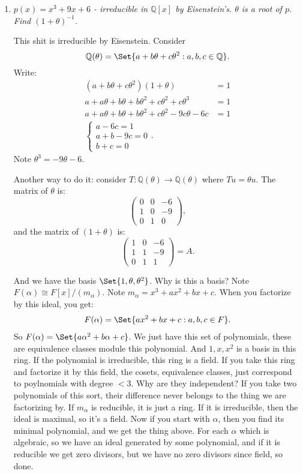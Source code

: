\documentclass[9pt,reqno,twoside]{amsbook}
\theoremstyle{plain}
\numberwithin{section}{chapter}
\numberwithin{equation}{chapter}
\theoremstyle{definition}
\theoremstyle{remark}
\theoremstyle{plain}
\newcommand{\Q}{\mathbb{Q}}
\newcommand{\bee}{\begin{equation}\begin{aligned}}
\newcommand{\eee}{\end{aligned}\end{equation}}
\newcommand{\lpar}{\left(}
\newcommand{\rpar}{\right)}
\begin{document}
\begin{enumerate}[label=\arabic*.]

\item \textit{$p(x) = x^3 + 9x + 6$ - irreducible in $\Q[x]$ by Eisenstein's. $\theta$ is a root of $p$. Find $(1 + \theta)^{-1}$. }

This shit is irreducible by Eisenstein. Consider 
$$
\Q(\theta) = \Set{a + b\theta + c\theta^2: a,b,c \in \Q}.
$$ 
Write:
\bee
(a + b\theta + c\theta^2)(1 + \theta) &= 1\\
a + a\theta + b\theta + b\theta^2 + c\theta^2 + c\theta^3 &= 1\\
a + a\theta + b\theta + b\theta^2 + c\theta^2 - 9c\theta -6c &= 1\\
\begin{cases}
a - 6c = 1\\
a + b - 9c = 0\\
b + c = 0
\end{cases}.
\eee
Note $\theta^3 = -9\theta - 6$. 

Another way to do it: consider $T: \Q(\theta) \to \Q(\theta)$ where $Tu = \theta u$. The matrix of $\theta$ is:
$$
\lpar 
\begin{matrix}
0 & 0 & -6\\
1 & 0 & -9\\
0 & 1 & 0
\end{matrix} \rpar,
$$
and the matrix of $(1 + \theta)$ is:
$$
\lpar 
\begin{matrix}
1 & 0 & -6\\
1 & 1 & -9\\
0 & 1 & 1
\end{matrix} \rpar = A.
$$

And we have the basis $\Set{1,\theta, \theta^2}$. Why is this a basis? Note $F(\alpha) \cong F[x]/(m_{\alpha})$. Note $m_{\alpha} = x^3 + ax^2 + bx + c$. When you factorize by this ideal, you get:
\bee
F(\alpha) = \Set{ax^2 + bx + c: a,b,c \in F}.
\eee
So $F(\alpha) = \Set{a\alpha^2 + b\alpha + c}$. We just have this set of polynomials, these are equivalence classes module this polynomial. And $1,x,x^2$ is a basis in this ring. If the polynomial is irreducible, this ring is a field. If you take this ring and factorize it by this field, the cosets, equivalence classes, just correspond to poylnomials with degree $< 3$. Why are they independent? If you take two polynomials of this sort, their difference never belongs to the thing we are factorizing by. If $m_\alpha$ is reducible, it is just a ring. If it is irreducible, then the ideal is maximal, so it's a field. Now if you start with $\alpha$, then you find its minimal polynomial, and we get the thing above. For each $\alpha$ which is algebraic, so we have an ideal generated by some polynomial, and if it is reducible we get zero divisors, but we have no zero divisors since field, so done. 




\end{enumerate}
\end{document}
